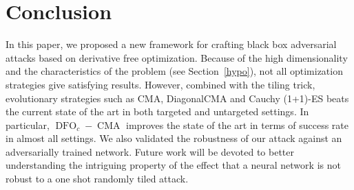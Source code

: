 \section{Conclusion}
\label{sec:conc}
In this paper, we proposed a new framework for crafting black box adversarial attacks based on derivative free optimization. Because of the high dimensionality and the characteristics of the problem (see Section~\ref{hypo}), not all optimization strategies give satisfying results. However, combined with the tiling trick, evolutionary strategies such as CMA, DiagonalCMA and  Cauchy (1+1)-ES beats the current state of the art in both targeted and untargeted settings.  In particular, $\operatorname{DFO}_c-\operatorname{CMA}$ improves the state of the art in terms of success rate in almost all settings. We also validated the robustness of our attack against an adversarially trained network. Future work will be devoted to better understanding the intriguing property of the effect that a neural network is not robust to a one shot randomly tiled attack.










